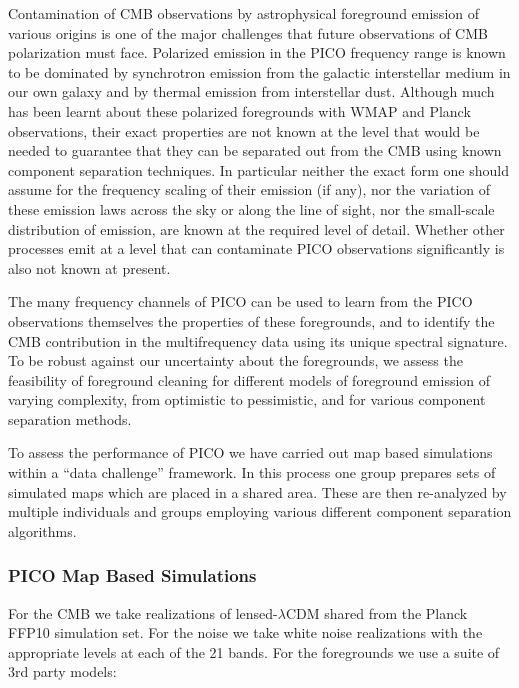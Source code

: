 \documentclass[PICOReport.tex]{subfiles}
\begin{document}
Contamination of CMB observations by astrophysical foreground emission of various origins is one of the major challenges that future observations of CMB polarization must face. Polarized emission in the PICO frequency range is known to be dominated by synchrotron emission from the galactic interstellar medium in our own galaxy and by thermal emission from interstellar dust. Although much has been learnt about these polarized foregrounds with WMAP and Planck observations, their exact properties are not known at the level that would be needed to guarantee that they can be separated out from the CMB using known component separation techniques. In particular neither the exact form one should assume for the frequency scaling of their emission (if any), nor the variation of these emission laws across the sky or along the line of sight, nor the small-scale distribution of emission, are known at the required level of detail. Whether other processes emit at a level that can contaminate PICO observations significantly is also not known at present. 

The many frequency channels of PICO can be used to learn from the PICO observations themselves the properties of these foregrounds, and to identify the CMB contribution in the multifrequency data using its unique spectral signature. To be robust against our uncertainty about the foregrounds, we assess the feasibility of foreground cleaning for different models of foreground emission of varying complexity, from optimistic to pessimistic, and for various component separation methods. 

To assess the performance of PICO we have carried out map based
simulations within a ``data challenge'' framework.
In this process one group prepares sets of simulated maps which are
placed in a shared area.
These are then re-analyzed by multiple individuals and groups employing various
different component separation algorithms.

\subsubsection{PICO Map Based Simulations}

For the CMB we take realizations of lensed-$\lambda$CDM shared from the
Planck FFP10 simulation set.
For the noise we take white noise realizations with the appropriate
levels at each of the 21 bands.
For the foregrounds we use a suite of 3rd party models:
\end{document}
